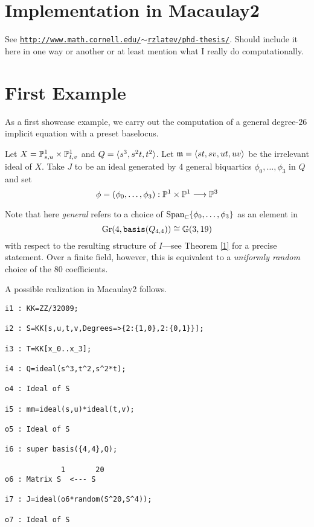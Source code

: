 \documentclass[fleqn,reqno]{amsart}
\numberwithin{first}{chapter}
\begin{document}
\section{Implementation in Macaulay2}

\begin{paragraf}
\label{par:algo-impl-1}
See \href{http://www.math.cornell.edu/~rzlatev/phd-thesis/}{\tt http://www.math.cornell.edu/$\sim$rzlatev/phd-thesis/}.
Should include it here in one way or another or at least mention what I really do computationally.
\end{paragraf}


\section{First Example}
\label{sec:first-example}

As a first showcase example, we carry out the computation of a general degree-$26$
implicit equation with a preset baselocus.

Let $X=\mathbb{P}^1_{s,u}\times\mathbb{P}^1_{t,v}$ and $Q=\langle s^3,s^2t,t^2\rangle$.
Let $\mathfrak{m}=\langle st,sv,ut,uv\rangle$ be the irrelevant ideal of $X$.
Take $J$ to be an ideal generated by $4$ general biquartics ${\phi_0,\ldots,\phi_3}$ in $Q$
and set
\[
\phi=(\phi_0,\ldots,\phi_3):\mathbb{P}^1\times\mathbb{P}^1\longrightarrow\mathbb{P}^3
\]

Note that here {\em general} refers to a choice of $\operatorname{Span}_{\mathbb{C}}\{\phi_0,\ldots,\phi_3\}$ as an
element in
\[
\text{Gr}(4,\mathop{\tt basis}(Q_{4,4}))\cong\mathbb{G}(3,19)
\]
with respect to the resulting structure of $I$---see Theorem \ref{1} for a precise statement.
Over a finite field, however, this is equivalent to a
{\em uniformly random} choice of the $80$ coefficients.

A possible realization in Macaulay2 follows.

\begin{verbatim}
i1 : KK=ZZ/32009;

i2 : S=KK[s,u,t,v,Degrees=>{2:{1,0},2:{0,1}}];

i3 : T=KK[x_0..x_3];

i4 : Q=ideal(s^3,t^2,s^2*t);

o4 : Ideal of S

i5 : mm=ideal(s,u)*ideal(t,v);

o5 : Ideal of S

i6 : super basis({4,4},Q);

             1       20
o6 : Matrix S  <--- S

i7 : J=ideal(o6*random(S^20,S^4));

o7 : Ideal of S

\end{verbatim}
\end{document}
